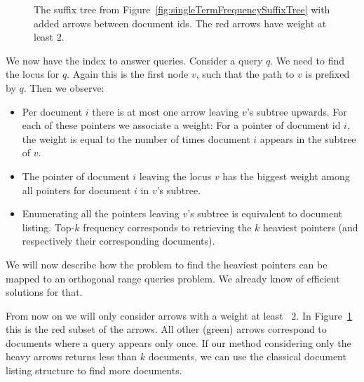 \begin{Proof}
  \begin{figure}[htb]
    \centering
    
    \caption{The suffix tree from Figure~\ref{fig:singleTermFrequencySuffixTree} with added arrows between document ids. The red arrows have weight at least $2$.}
    \label{fig:singleTermFrequencySuffixTreeDocumentArrows}
  \end{figure}

  We now have the index to answer queries. Consider a query $q$. We need to find the locus for $q$. Again this is the first node $v$, such that the path to $v$ is prefixed by $q$. Then we observe:
  \begin{itemize}
    \item Per document $i$ there is at most one arrow leaving $v$'s subtree upwards. For each of these pointers we associate a weight: For a pointer of document id $i$, the weight is equal to the number of times document $i$ appears in the subtree of $v$.
    \item The pointer of document $i$ leaving the locus $v$ has the biggest weight among all pointers for document $i$ in $v$'s subtree.
    \item Enumerating all the pointers leaving $v$'s subtree is equivalent to document listing. Top-$k$ frequency corresponds to retrieving the $k$ heaviest pointers (and respectively their corresponding documents).
  \end{itemize}

  We will now describe how the problem to find the heaviest pointers can be mapped to an orthogonal range queries problem. We already know of efficient solutions for that.
  
  From now on we will only consider arrows with a weight at least ~$2$. In Figure~\ref{fig:singleTermFrequencySuffixTreeDocumentArrows} this is the red subset of the arrows. All other (green) arrows correspond to documents where a query appears only once. If our method considering only the heavy arrows returns less than $k$ documents, we can use the classical document listing structure to find more documents.


\end{Proof}

